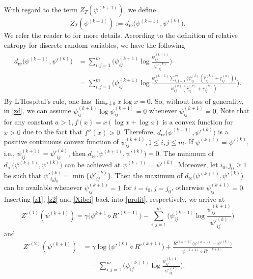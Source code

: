 \documentclass[11pt]{article}
\numberwithin{equation}{section}
\begin{document}
 With regard to the term  $Z_T(\psi^{(k+1)})$, we define 
 \begin{equation}\label{Xibei}
 Z_	T(\psi^{(k+1)}):=d_{\mbox{re}}\Big(\psi^{(k+1)},\psi'^{(k)}\Big). 
 \end{equation}
 We refer the reader to \cite{ALZ2001, helmbold, kivinen} for more details. According to the definition of relative entropy for discrete random variables, we have the following 
\begin{align}\label{zd}
\begin{split}
d_{\mbox{re}}\Big(\psi^{(k+1)},\psi'^{(k)}\Big)&=\sum_{i,j=1}^{m}\bigg(\psi^{(k+1)}_{ij}\log\frac{\psi^{(k+1)}_{ij}}{\psi'^{(k)}_{ij}}\bigg)\\
&=\sum_{i,j=1}^{m}\bigg(\psi^{(k+1)}_{ij}\log\frac{\psi^{(k+1)}_{ij}\sum_{i,j=1}^{m}\Big( \psi_{ij}^{(k)}(\bar r^{(k)}_{ij}+\underline r^{(k)}_{ij})\Big)}{\psi^{(k)}_{ij}(\bar r^{(k)}_{ij}+\underline r^{(k)}_{ij})}\bigg).
\end{split}
\end{align}
By L'Hospital's rule, one has $\lim_{x\downarrow0}x\log x=0$. So, without loss of generality,  in \eqref{zd}, we can assume $\psi^{(k+1)}_{ij}\log\psi^{(k+1)}_{ij}=0$ whenever $\psi^{(k+1)}_{ij}=0.$
Note that for any constant $a>1,f(x)=x(\log x+\log a)$ is a convex function for $x>0$
due to the fact that $f''(x)>0$. Therefore,
$d_{\mbox{re}}\Big(\psi^{(k+1)},\psi'^{(k)}\Big)$ is  a positive continuous
convex function of $\psi^{(k+1)}_{ij}, 1\le i,j\le m$. If $ \psi^{(k+1)}=\psi'^{(k)}$, 
i.e., $\psi^{(k+1)}_{ij}=\psi'^{(k)}_{ij}$, then
$d_{\mbox{re}}\Big(\psi^{(k+1)},\psi'^{(k)}\Big)=0$. The minimum of
$d_{\mbox{re}}\Big(\psi^{(k+1)},\psi'^{(k)}\Big)$ can be achieved at $
\psi^{(k+1)}=\psi'^{(k)}$. Moreover, let $i_0,j_0\ge1$ be such that
$\psi'^{(k)}_{i_0j_0}=\min\{\psi'^{(k)}_{ij}\}$. Then the maximum of
$d_{\mbox{re}}\Big(\psi^{(k+1)},\psi'^{(k)}\Big)$ can be available whenever
$\psi^{(k+1)}_{ij}=1$ for $i=i_0,j=j_0$, otherwise
$\psi^{(k+1)}_{ij}=0$.
Inserting \eqref{z1}, \eqref{z2} and \eqref{Xibei} back into \eqref{profit}, respectively, we arrive at 
\begin{equation}\label{z111}
Z'^{(1)}(\psi^{(k+1)})=\gamma\Big( \psi^{k+1}\diamond R'^{(k+1)}\Big)-\sum_{i,j=1}^{m}\bigg(\psi^{(k+1)}_{ij}\log\frac{\psi^{(k+1)}_{ij}}{\psi'^{(k)}_{ij}}\bigg) 
\end{equation}
and 
\begin{equation}\label{z221}
\begin{split}
Z'^{(2)}(\psi^{(k+1)})&=\gamma \log\Big(\psi'^{(k)}\diamond R'^{(k+1)}\Big)+\frac{R'^{(k+1)}\Big(\psi^{(k+1)}-\psi'^{(k)}\Big)}{\psi^{(k+1)}\diamond R'^{(k+1)}}\\
&\quad-\sum_{i,j=1}^{m}\bigg(\psi^{(k+1)}_{ij}\log\frac{\psi^{(k+1)}_{ij}}{\psi'^{(k)}_{ij}}\bigg). 
\end{split}
\end{equation}
\end{document}
